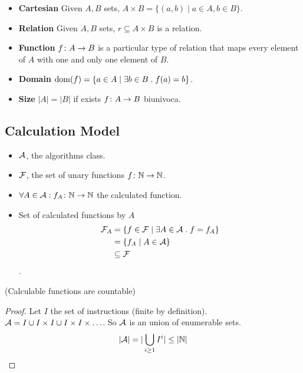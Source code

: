 \documentclass[12pt,a4paper,oneside]{book}
\begin{document}
\begin{itemize}
    \item \textbf{Cartesian} Given $A, B$ sets, $A \times B = \{ (a,b)
      \mid a \in A, b \in B\}$.
    \item \textbf{Relation} Given $A, B$ sets, $r \subseteq A \times
      B$ is a relation.
    \item \textbf{Function} $\mathord{f}\colon A\to B$ is a particular type of
      relation that maps every element of $A$ with one and only one
      element of $B$.
    \item \textbf{Domain} $\mathop{\mathrm{dom}}\nolimits(f) = \{ a \in A \mid \exists b \in B
      \mathrel{.} f(a) = b \}$.
    \item \textbf{Size} $|A| = |B|$ if exists $\mathord{f}\colon A\to B$
      biunivoca.
\end{itemize}

\subsection{Calculation Model}

\begin{itemize}
    \item $\mathcal{A}$, the algorithms class.
    \item $\mathcal{F}$, the set of unary functions
      $\mathord{f}\colon\mathbb{N}\to\mathbb{N}$.
    \item $\forall A \in \mathcal{A} \mathrel{:} \mathord{f_A}\colon\mathbb{N}\to\mathbb{N}$ the
      calculated function.
    \item Set of calculated functions by $A$
    \begin{align*}
        \mathcal{F}_A &= \{ f \in \mathcal{F} \mid \exists A \in \mathcal{A} \mathrel{.} f = f_A \} \\ 
          &= \{ f_A \mid A \in \mathcal{A} \} \\
          &\subseteq \mathcal{F}
    \end{align*}.
\end{itemize}

\begin{lemma}{(Calculable functions are countable)}
    \begin{proof}
        Let $I$ the set of instructions (finite by definition). $\mathcal{A}
        = I \cup I \times I \cup I \times I \times \ldots$. So $\mathcal{A}$
        is an union of enumerable sets.
        \[
          |\mathcal{A}| = | \bigcup_{i \geq 1} I^i | \leq | \mathbb{N} |
        \]
    \end{proof}
\end{lemma}
\end{document}
